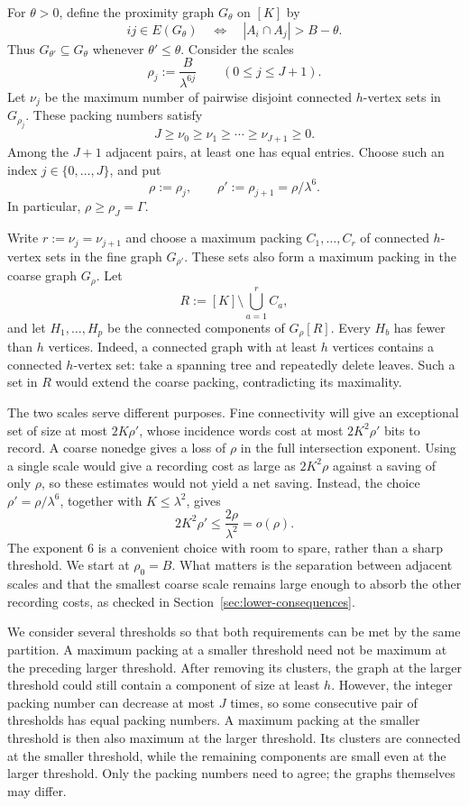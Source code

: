 \documentclass[11pt]{article}
\theoremstyle{definition}
\theoremstyle{remark}
\begin{document}
For $\theta>0$, define the proximity graph $G_\theta$ on $[K]$ by
\[
  ij\in E(G_\theta)
  \quad\Longleftrightarrow\quad
  |A_i\cap A_j|>B-\theta.
\]
Thus $G_{\theta'}\subseteq G_\theta$ whenever $\theta'\le\theta$. Consider
the scales
\[
  \rho_j:=\frac{B}{\lambda^{6j}}
  \qquad(0\le j\le J+1).
\]
Let $\nu_j$ be the maximum number of pairwise disjoint connected
$h$-vertex sets in $G_{\rho_j}$. These packing numbers satisfy
\[
  J\ge\nu_0\ge\nu_1\ge\cdots\ge\nu_{J+1}\ge0.
\]
Among the $J+1$ adjacent pairs, at least one has equal entries. Choose such
an index $j\in\{0,\ldots,J\}$, and put
\begin{equation}
  \rho:=\rho_j,\qquad
  \rho':=\rho_{j+1}=\rho/\lambda^6.
  \label{eq:selected-scales}
\end{equation}
In particular, $\rho\ge\rho_J=\Gamma$.

Write $r:=\nu_j=\nu_{j+1}$ and choose a maximum packing
$C_1,\ldots,C_r$ of connected $h$-vertex sets in the fine graph
$G_{\rho'}$. These sets also form a maximum packing in the coarse graph
$G_\rho$. Let
\[
  R:=[K]\setminus\bigcup_{a=1}^r C_a,
\]
and let $H_1,\ldots,H_p$ be the connected components of $G_\rho[R]$.
Every $H_b$ has fewer than $h$ vertices. Indeed, a connected graph with at
least $h$ vertices contains a connected $h$-vertex set: take a spanning tree
and repeatedly delete leaves. Such a set in $R$ would extend the coarse
packing, contradicting its maximality.

The two scales serve different purposes. Fine connectivity will give an
exceptional set of size at most $2K\rho'$, whose incidence words cost at
most $2K^2\rho'$ bits to record. A coarse nonedge gives a loss of $\rho$
in the full intersection exponent. Using a single scale would give a
recording cost as large as $2K^2\rho$ against a saving of only $\rho$,
so these estimates would not yield a net saving. Instead, the choice
$\rho'=\rho/\lambda^6$, together with $K\le \lambda^2$, gives
\[
  2K^2\rho'\le\frac{2\rho}{\lambda^2}=o(\rho).
\]
The exponent $6$ is a convenient choice with room to spare, rather than a
sharp threshold. We start at $\rho_0=B$. What matters is the separation
between adjacent scales and that the smallest coarse scale remains large
enough to absorb the other recording costs, as checked in
Section~\ref{sec:lower-consequences}.

We consider several thresholds so that both requirements can be met by
the same partition. A maximum packing at a smaller threshold need not
be maximum at the preceding larger threshold. After removing its clusters,
the graph at the larger threshold could still contain a component of size
at least $h$. However, the integer packing number can decrease at most $J$
times, so some consecutive pair of thresholds has equal packing numbers.
A maximum packing at the smaller threshold is then also maximum at the
larger threshold. Its clusters are connected at the smaller threshold,
while the remaining components are small even at the larger threshold.
Only the packing numbers need to agree; the graphs themselves may differ.
\end{document}
